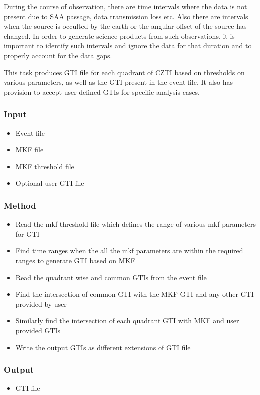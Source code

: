 \documentclass[11pt,oneside,a4paper]{article}
\begin{document}
During the course of observation, there are time intervals where the data is not 
present due to SAA passage, data transmission loss etc. Also there are intervals 
when the source is occulted by the earth or the angular offset of the source has changed. 
In order to generate science products from such observations, it is important 
to identify such intervals and ignore the data for that duration and to properly 
account for the data gaps.

This task produces GTI file for each quadrant of CZTI based on thresholds on 
various parameters, as well as the GTI present in the event file. It also 
has provision to accept user defined GTIs for specific analysis cases.

\subsubsection*{Input}
\renewcommand\labelitemi{{\boldmath$\cdot$}}
\begin{itemize}
\item{Event file}
\item{MKF file}
\item{MKF threshold file}    
\item{Optional user GTI file}    
\end{itemize}
\subsubsection*{Method}
\begin{itemize}
\item{Read the mkf threshold file which defines the range of various mkf parameters for GTI}
\item{Find time ranges when the all the mkf parameters are within the required ranges to generate GTI 
    based on MKF}    
\item{Read the quadrant wise and common GTIs from the event file}        
\item{Find the intersection of common GTI with the MKF GTI and any other GTI provided by user}
\item{Similarly find the intersection of each quadrant GTI with MKF and user provided GTIs}
\item{Write the output GTIs as different extensions of GTI file}
\end{itemize}
\subsubsection*{Output}
\begin{itemize}
    \item{GTI file}
\end{itemize}
\end{document}
